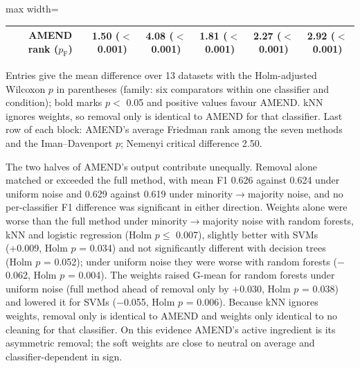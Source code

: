 \documentclass[conference]{IEEEtran}
\begin{document}
\begin{table}[!t]
\begin{adjustbox}{max width=\linewidth}
\begin{tabular}{lcccccc}
& AMEND rank ($p_{\mathrm{F}}$) & 1.50 ($<$0.001) & 4.08 ($<$0.001) & 1.81 ($<$0.001) & 2.27 ($<$0.001) & 2.92 ($<$0.001) \\
\hline
\end{tabular}
\end{adjustbox}
\par\vspace{3pt}
\begin{minipage}{\linewidth}\scriptsize Entries give the mean difference over 13 datasets with the Holm-adjusted Wilcoxon $p$ in parentheses (family: six comparators within one classifier and condition); bold marks $p <$ 0.05 and positive values favour AMEND. kNN ignores weights, so removal only is identical to AMEND for that classifier. Last row of each block: AMEND's average Friedman rank among the seven methods and the Iman--Davenport $p$; Nemenyi critical difference 2.50.\end{minipage}
\end{table}

The two halves of AMEND's output contribute unequally. Removal alone matched or exceeded the full method, with mean F1 0.626 against 0.624 under uniform noise and 0.629 against 0.619 under minority$\rightarrow $majority noise, and no per-classifier F1 difference was significant in either direction. Weights alone were worse than the full method under minority$\rightarrow $majority noise with random forests, kNN and logistic regression (Holm $p \le $ 0.007), slightly better with SVMs (+0.009, Holm $p$ = 0.034) and not significantly different with decision trees (Holm $p$ = 0.052); under uniform noise they were worse with random forests ($-$0.062, Holm $p$ = 0.004). The weights raised G-mean for random forests under uniform noise (full method ahead of removal only by +0.030, Holm $p$ = 0.038) and lowered it for SVMs ($-$0.055, Holm $p$ = 0.006). Because kNN ignores weights, removal only is identical to AMEND and weights only identical to no cleaning for that classifier. On this evidence AMEND's active ingredient is its asymmetric removal; the soft weights are close to neutral on average and classifier-dependent in sign.
\end{document}
